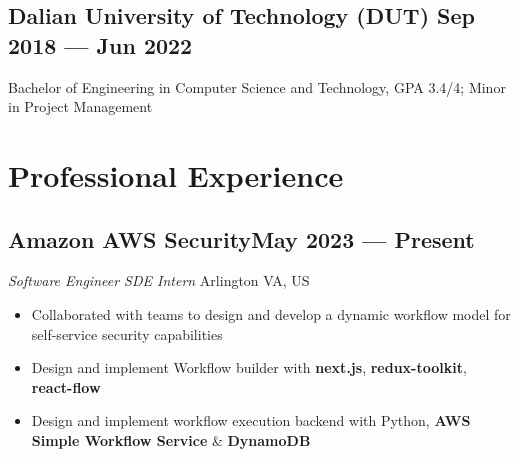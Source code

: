 \documentclass[a4,12pt]{article}
\newcommand{\subtext}[1]{
#1\par\vspace{-0.3cm}}
\newenvironment{zitemize}{
\begin{itemize}\itemsep0pt \parskip0pt \parsep1pt}
{\end{itemize}\vspace{-0.5cm}}
\begin{document}
\vspace{-0.4cm}
\subsection*{Dalian University of Technology (DUT) \hfill \textbf{Sep 2018 --- Jun 2022}}
Bachelor of Engineering in Computer Science and Technology, GPA 3.4/4; Minor in Project Management




\vspace{-0.5cm}


\section{\textbf{Professional Experience}}
        
\vspace{-0.15cm}


\subsection*{\normalsize\textbf{Amazon AWS Security}\hfill May 2023 --- Present} 
\subtext{\textit{Software Engineer SDE Intern} \hfill Arlington VA, US} 
    \begin{zitemize}
        \item Collaborated with teams to design and develop a dynamic workflow model for self-service security capabilities
        \item Design and implement Workflow builder with \textbf{next.js}, \textbf{redux-toolkit}, \textbf{react-flow}
        \item Design and implement workflow execution backend with Python, \textbf{AWS Simple Workflow Service} \& \textbf{DynamoDB}
    \end{zitemize}

\vspace{-0.1cm}

\end{document}
